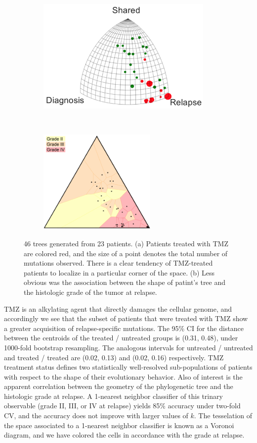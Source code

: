\documentclass[a4paper,11pt]{article}
\begin{document}
\begin{figure}
    \begin{subfigure}{0.5\linewidth}
    \centering
    \includegraphics[height=2.2in]{../figures/glioma_triplet.png}
    \end{subfigure}
    ~
    \begin{subfigure}{0.5\linewidth}
    \centering
    \includegraphics[height=2in]{../figures/glioma_voronoi_stage.png}
    \end{subfigure}

    \caption{46 trees generated from 23 patients. (a) Patients treated with TMZ are colored red, and the size of a point denotes the total number of mutations observed. There is a clear tendency of TMZ-treated patients to localize in a particular corner of the space. (b) Less obvious was the association between the shape of patint's tree and the histologic grade of the tumor at relapse.}
    \label{fig:gliomaTMZ}
\end{figure}

TMZ is an alkylating agent that directly damages the cellular genome, and accordingly we see that the subset of patients that were treated with TMZ show a greater acquisition of relapse-specific mutations.
The 95\% CI for the distance between the centroids of the treated / untreated groups is (0.31, 0.48), under 1000-fold bootstrap resampling.
The analogous intervals for untreated / untreated and treated / treated are (0.02, 0.13) and (0.02, 0.16) respectively.
TMZ treatment status defines two statistically well-resolved sub-populations of patients with respect to the shape of their evolutionary behavior.
Also of interest is the apparent correlation between the geometry of the phylogenetic tree and the histologic grade at relapse.
A 1-nearest neighbor classifier of this trinary observable (grade II, III, or IV at relapse) yields 85\% accuracy under two-fold CV, and the accuracy does not improve with larger values of $k$.
The tesselation of the space associated to a 1-nearest neighbor classifier is known as a Voronoi diagram, and we have colored the cells in accordance with the grade at relapse.
\end{document}
